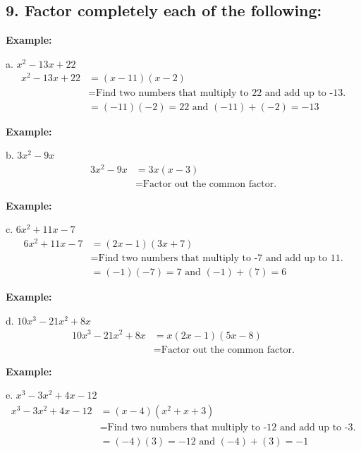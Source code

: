 \documentclass[12pt,a4paper]{article}
\newenvironment{example}
  {\begin{framed}\colorbox{examplecolor}{
  \parbox{\dimexpr\linewidth-2\fboxsep}{
  \textbf{Example:}}}}
  {\end{framed}}
\begin{document}
\newpage



\subsection*{9. Factor completely each of the following:}

\begin{example}
a. $x^2 - 13x + 22$
\begin{align*}
x^2 - 13x + 22 &= (x - 11)(x - 2) \\
&= \text{Find two numbers that multiply to 22 and add up to -13.} \\
&= (-11)(-2) = 22 \text{ and } (-11) + (-2) = -13
\end{align*}
\end{example}

\begin{example}
b. $3x^2 - 9x$
\begin{align*}
3x^2 - 9x &= 3x(x - 3) \\
&= \text{Factor out the common factor.}
\end{align*}
\end{example}

\begin{example}
c. $6x^2 + 11x - 7$
\begin{align*}
6x^2 + 11x - 7 &= (2x - 1)(3x + 7) \\
&= \text{Find two numbers that multiply to -7 and add up to 11.} \\
&= (-1)(-7) = 7 \text{ and } (-1) + (7) = 6
\end{align*}
\end{example}

\begin{example}
d. $10x^3 - 21x^2 + 8x$
\begin{align*}
10x^3 - 21x^2 + 8x &= x(2x - 1)(5x - 8) \\
&= \text{Factor out the common factor.}
\end{align*}
\end{example}

\begin{example}
e. $x^3 - 3x^2 + 4x - 12$
\begin{align*}
x^3 - 3x^2 + 4x - 12 &= (x - 4)(x^2 + x + 3) \\
&= \text{Find two numbers that multiply to -12 and add up to -3.} \\
&= (-4)(3) = -12 \text{ and } (-4) + (3) = -1
\end{align*}
\end{example}
\end{document}
